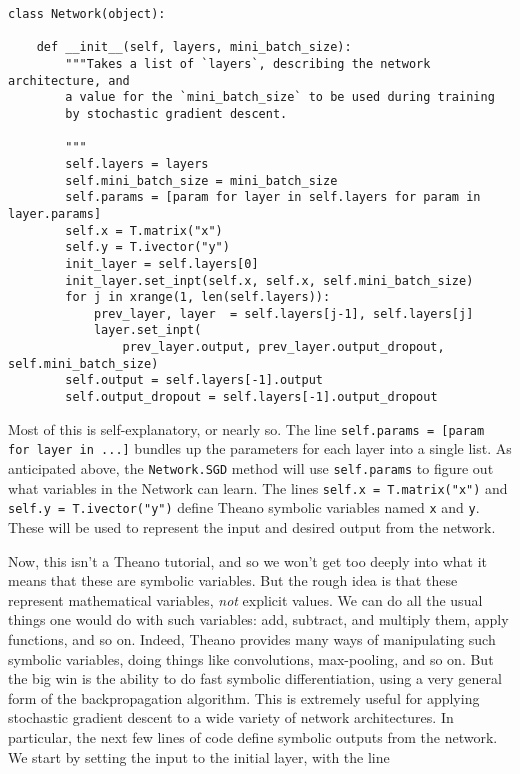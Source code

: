 \begin{lstlisting}
class Network(object):
    
    def __init__(self, layers, mini_batch_size):
        """Takes a list of `layers`, describing the network architecture, and
        a value for the `mini_batch_size` to be used during training
        by stochastic gradient descent.

        """
        self.layers = layers
        self.mini_batch_size = mini_batch_size
        self.params = [param for layer in self.layers for param in layer.params]
        self.x = T.matrix("x")  
        self.y = T.ivector("y")
        init_layer = self.layers[0]
        init_layer.set_inpt(self.x, self.x, self.mini_batch_size)
        for j in xrange(1, len(self.layers)):
            prev_layer, layer  = self.layers[j-1], self.layers[j]
            layer.set_inpt(
                prev_layer.output, prev_layer.output_dropout, self.mini_batch_size)
        self.output = self.layers[-1].output
        self.output_dropout = self.layers[-1].output_dropout
\end{lstlisting}

Most of this is self-explanatory, or nearly so. The line \lstinline{self.params = [param for layer in ...]} bundles up the parameters for each layer into a single list. As anticipated above, the \lstinline{Network.SGD} method will use \lstinline{self.params} to figure out what variables in the Network can learn. The lines \lstinline{self.x = T.matrix("x")} and \lstinline{self.y = T.ivector("y")} define Theano symbolic variables named \lstinline{x} and \lstinline{y}. These will be used to represent the input and desired output from the network.


Now, this isn't a Theano tutorial, and so we won't get too deeply into what it means that these are symbolic variables. But the rough idea is that these represent mathematical variables, \textit{not} explicit values. We can do all the usual things one would do with such variables: add, subtract, and multiply them, apply functions, and so on. Indeed, Theano provides many ways of manipulating such symbolic variables, doing things like convolutions, max-pooling, and so on. But the big win is the ability to do fast symbolic differentiation, using a very general form of the backpropagation algorithm. This is extremely useful for applying stochastic gradient descent to a wide variety of network architectures. In particular, the next few lines of code define symbolic outputs from the network. We start by setting the input to the initial layer, with the line


